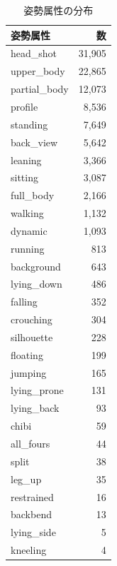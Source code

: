 \documentclass[a4j,12pt,dvipdfmx]{jsreport}
\begin{document}
\begin{table}[htbp]
   \centering
   \begin{minipage}[t]{0.48\linewidth}
      \centering
      \caption{姿勢属性の分布}
      \label{tab:ci_pose_enum_stats}
      \begin{tabular}{lr}
         \toprule
         姿勢属性          & 数        \\
         \midrule
         head\_shot    & 31{,}905 \\
         upper\_body   & 22{,}865 \\
         partial\_body & 12{,}073 \\
         profile       & 8{,}536  \\
         standing      & 7{,}649  \\
         back\_view    & 5{,}642  \\
         leaning       & 3{,}366  \\
         sitting       & 3{,}087  \\
         full\_body    & 2{,}166  \\
         walking       & 1{,}132  \\
         dynamic       & 1{,}093  \\
         running       & 813      \\
         background    & 643      \\
         lying\_down   & 486      \\
         falling       & 352      \\
         crouching     & 304      \\
         silhouette    & 228      \\
         floating      & 199      \\
         jumping       & 165      \\
         lying\_prone  & 131      \\
         lying\_back   & 93       \\
         chibi         & 59       \\
         all\_fours    & 44       \\
         split         & 38       \\
         leg\_up       & 35       \\
         restrained    & 16       \\
         backbend      & 13       \\
         lying\_side   & 5        \\
         kneeling      & 4        \\

\end{tabular}
\end{minipage}
\end{table}
\end{document}
